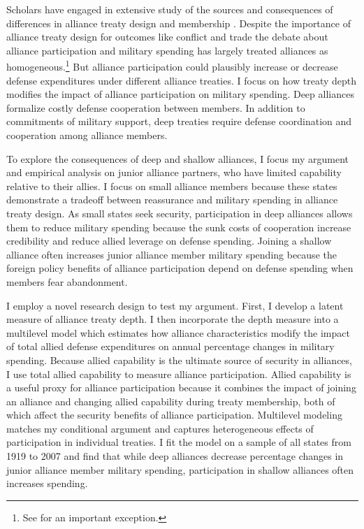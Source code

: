 \documentclass[12pt]{article}
\begin{document}
Scholars have engaged in extensive study of the sources and consequences of differences in alliance treaty design and membership \citep{Mattes2012, Benson2012, Poast2019a, Morrow1991, Leeds2003, LeedsAnac2005, Fordham2010, Mattes2012,  Poast2013, Johnsonetal2015}. 
Despite the importance of alliance treaty design for outcomes like conflict \citep{Leeds2003, Benson2012} and trade \citep{LongLeeds2006} the debate about alliance participation and military spending has largely treated alliances as homogeneous.\footnote{See \citet{DigiuseppePoast2016} for an important exception.}
But alliance participation could plausibly increase or decrease defense expenditures under different alliance treaties. 
I focus on how treaty depth modifies the impact of alliance participation on military spending. 
Deep alliances formalize costly defense cooperation between members. 
In addition to commitments of military support, deep treaties require defense coordination and cooperation among alliance members. 


To explore the consequences of deep and shallow alliances, I focus my argument and empirical analysis on junior alliance partners, who have limited capability relative to their allies. 
I focus on small alliance members because these states demonstrate a tradeoff between reassurance and military spending in alliance treaty design.
As small states seek security, participation in deep alliances allows them to reduce military spending because the sunk costs of cooperation increase credibility and reduce allied leverage on defense spending. 
Joining a shallow alliance often increases junior alliance member military spending because the foreign policy benefits of alliance participation depend on defense spending when members fear abandonment.

 
I employ a novel research design to test my argument.
First, I develop a latent measure of alliance treaty depth. 
I then incorporate the depth measure into a multilevel model which estimates how alliance characteristics modify the impact of total allied defense expenditures on annual percentage changes in military spending.
Because allied capability is the ultimate source of security in alliances, I use total allied capability to measure alliance participation.  
Allied capability is a useful proxy for alliance participation because it combines the impact of joining an alliance and changing allied capability during treaty membership, both of which affect the security benefits of alliance participation. 
Multilevel modeling matches my conditional argument and captures heterogeneous effects of participation in individual treaties. 
I fit the model on a sample of all states from 1919 to 2007 and find that while deep alliances decrease percentage changes in junior alliance member military spending, participation in shallow alliances often increases spending.
\end{document}
